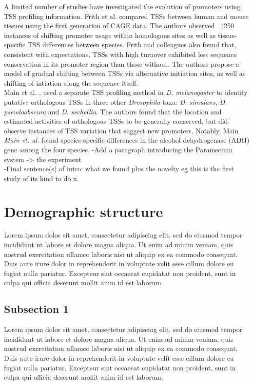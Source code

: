 \documentclass[nogrid]{MBE}%
\begin{document}
A limited number of studies have investigated the evolution of promoters using TSS profiling information. Frith et al. \citep{Frith:2006bb} compared TSSs between human and mouse tissues using the first generation of CAGE data. The authors observed ~1250 instances of shifting promoter usage within homologous sites as well as tissue-specific TSS differences between species. Frith and colleagues also found that, consistent with expectations, TSSs with high turnover exhibited less sequence conservation in its promoter region than those without. The authors propose a model of gradual shifting between TSSs via alternative initiation sites, as well as shifting of intiation along the sequence itself. \\
Main et al. \citep{Main:2013dg}, used a separate TSS profiling method in \textit{D. melanogaster} to identify putative orthologous TSSs in three other \textit{Drosophila} taxa: \textit{D. simulans}, \textit{D. pseudoobscura} and \textit{D. sechellia}. The authors found that the location and estimated activities of orthologous TSSs to be generally conserved, but did observe instances of TSS variation that suggest new promoters. Notably, Main \textit{Main et. al.} found species-specific differences in the alcohol dehydrogenase (ADH) gene among the four species. 
-Add a paragraph introducing the Paramecium system -> the experiment\\
-Final sentence(s) of intro: what we found plus the novelty eg this is the first study of its kind to do x.

\section{Demographic structure}

Lorem ipsum dolor sit amet, consectetur adipiscing elit, sed do eiusmod tempor incididunt ut labore et dolore magna aliqua. Ut enim ad minim veniam, quis nostrud exercitation ullamco laboris nisi ut aliquip ex ea commodo consequat. Duis aute irure dolor in reprehenderit in voluptate velit esse cillum dolore eu fugiat nulla pariatur. Excepteur sint occaecat cupidatat non proident, sunt in culpa qui officia deserunt mollit anim id est laborum.

\subsection{Subsection 1}

Lorem ipsum dolor sit amet, consectetur adipiscing elit, sed do eiusmod tempor incididunt ut labore et dolore magna aliqua. Ut enim ad minim veniam, quis nostrud exercitation ullamco laboris nisi ut aliquip ex ea commodo consequat. Duis aute irure dolor in reprehenderit in voluptate velit esse cillum dolore eu fugiat nulla pariatur. Excepteur sint occaecat cupidatat non proident, sunt in culpa qui officia deserunt mollit anim id est laborum.
\end{document}
